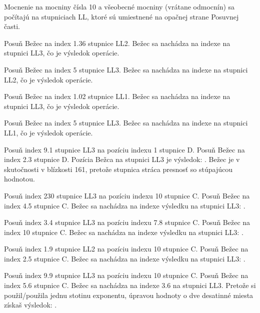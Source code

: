 \begin{multicols*}{3}
{  

\footnotesize Mocnenie na mocniny čísla 10 a všeobecné mocniny (vrátane odmocnín) sa počítajú na stupniciach LL, ktoré sú umiestnené na opačnej strane Posuvnej časti. \normalsize

Posuň Bežec na index 1.36 stupnice LL2.
Bežec sa nachádza na indexe  na stupnici LL3, čo je výsledok operácie.


Posuň Bežec na index 5 stupnice LL3.
Bežec sa nachádza na indexe  na stupnici LL2, čo je výsledok operácie.


Posuň Bežec na index 1.02 stupnice LL1.
Bežec sa nachádza na indexe  na stupnici LL3, čo je výsledok operácie.


Posuň Bežec na index 5 stupnice LL3.
Bežec sa nachádza na indexe  na stupnici LL1, čo je výsledok operácie.


Posuň index 9.1 stupnice LL3 na pozíciu indexu 1 stupnice D.
Posuň Bežec na index 2.3 stupnice D.
Pozícia Bežca na stupnici LL3 je výsledok: . Bežec je v skutočnosti v blízkosti 161, pretože stupnica stráca presnosť so stúpajúcou hodnotou. 

Posuň index 230 stupnice LL3 na pozíciu indexu 10 stupnice C.
Posuň Bežec na index 4.5 stupnice C.
Bežec sa nachádza na indexe výsledku na stupnici LL3: .

Posuň index 3.4 stupnice LL3 na pozíciu indexu 7.8 stupnice C.
Posuň Bežec na index 10 stupnice C.
Bežec sa nachádza na indexe výsledku na stupnici LL3: .

Posuň index 1.9 stupnice LL2 na pozíciu indexu 10 stupnice C.
Posuň Bežec na index 2.5 stupnice C.
Bežec sa nachádza na indexe výsledku na stupnici LL3: .

Posuň index 9.9 stupnice LL3 na pozíciu indexu 10 stupnice C.
Posuň Bežec na index 5.6 stupnice C.
Bežec sa nachádza na indexe 3.6 na stupnici LL3.
Pretože si použil/použila jednu stotinu exponentu, úpravou hodnoty o dve desatinné miesta získaš výsledok: .

}
\end{multicols*}
